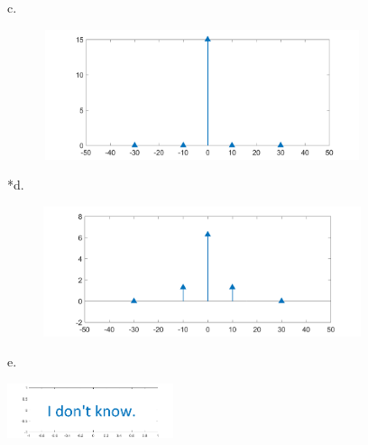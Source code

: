 c. 

\includegraphics[width=4.5in,height=1.5in]{../../Images/FrequencyDomainQ2c.png}

*d.

\includegraphics[width=4.5in,height=1.5in]{../../Images/FrequencyDomainQ2d.png}

e. 

\includegraphics[width=1.92042in,height=0.62319in]{../../Images/AnswerEGraph.png}\\
